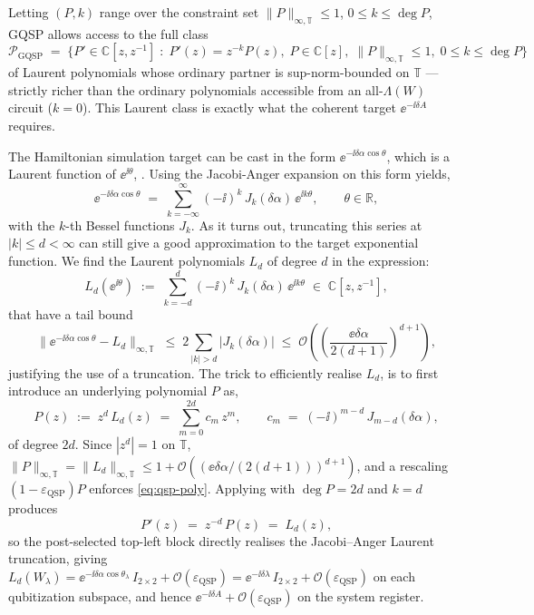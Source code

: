 Letting $(P, k)$ range over the constraint set $\|P\|_{\infty,\mathbb{T}} \leq 1$, $0 \leq k \leq \deg P$, GQSP allows access to the full class
$$
\mathcal{P}_{\text{GQSP}} \;=\; \bigl\{P' \in \mathbb{C}[z, z^{-1}] \;:\; P'(z) = z^{-k}P(z),\; P \in \mathbb{C}[z],\; \|P\|_{\infty,\mathbb{T}} \leq 1,\; 0 \leq k \leq \deg P \bigr\}
$$
of Laurent polynomials whose ordinary partner is sup-norm-bounded on $\mathbb{T}$ — strictly richer than the ordinary polynomials accessible from an all-$\Lambda(W)$ circuit ($k = 0$). This Laurent class is exactly what the coherent target $\ee^{-\ii\delta A}$ requires.

The Hamiltonian simulation target can be cast in the form $\ee^{-\ii\delta\alpha\cos\theta}$, which is a Laurent function of $\ee^{\ii\theta}$, \cite[Thm. 6]{motlagh2024generalized}. Using the Jacobi-Anger expansion on this form yields, 
\begin{equation} \label{eq:jacobi-anger}
    \ee^{-\ii\delta\alpha\cos\theta} \;=\; \sum_{k=-\infty}^{\infty} (-\ii)^k\,J_k(\delta\alpha)\,\ee^{\ii k\theta}, \qquad \theta \in \mathbb{R},
\end{equation}
with the $k$-th Bessel functions $J_k$. As it turns out, truncating this series at $|k|\leq d < \infty$ can still give a good approximation to the target exponential function. We find the Laurent polynomials $L_d$ of degree $d$ in the expression:
$$
L_d(\ee^{\ii\theta}) \;:=\; \sum_{k=-d}^{d} (-\ii)^k\,J_k(\delta\alpha)\,\ee^{\ii k\theta} \;\in\; \mathbb{C}[z,z^{-1}],
$$
that have a tail bound 
$$
\bigl\|\ee^{-\ii\delta\alpha\cos\theta} - L_d\bigr\|_{\infty,\mathbb{T}} \;\leq\; 2\!\!\sum_{|k|>d}\!|J_k(\delta\alpha)| \;\leq\; \mathcal{O}\!\left(\!\left(\frac{\ee\delta\alpha}{2(d+1)}\right)^{d+1}\right),
$$
justifying the use of a truncation. The trick to efficiently realise $L_d$, is to first introduce an underlying polynomial $P$ as, 
$$
P(z) \;:=\; z^{d}\,L_{d}(z) \;=\; \sum_{m=0}^{2d} c_m\,z^m, \qquad c_m \;=\; (-\ii)^{m-d}\,J_{m-d}(\delta\alpha),
$$
of degree $2d$. Since $|z^d|=1$ on $\mathbb{T}$, $\|P\|_{\infty,\mathbb{T}} = \|L_d\|_{\infty,\mathbb{T}} \leq 1 + \mathcal{O}((\ee\delta\alpha/(2(d+1)))^{d+1})$, and a rescaling $(1-\varepsilon_\text{QSP})P$ enforces \eqref{eq:qsp-poly}. Applying \cite[Thm. 6]{motlagh2024generalized} with $\deg P = 2d$ and $k = d$ produces
$$
P'(z) \;=\; z^{-d}\,P(z) \;=\; L_d(z),
$$
so the post-selected top-left block directly realises the Jacobi–Anger Laurent truncation, giving $L_d(W_\lambda) = \ee^{-\ii\delta\alpha\cos\theta_\lambda}\,I_{2\times 2} + \mathcal{O}(\varepsilon_\text{QSP}) = \ee^{-\ii\delta\lambda}\,I_{2\times 2} + \mathcal{O}(\varepsilon_\text{QSP})$ on each qubitization subspace, and hence $\ee^{-\ii\delta A} + \mathcal{O}(\varepsilon_\text{QSP})$ on the system register.

